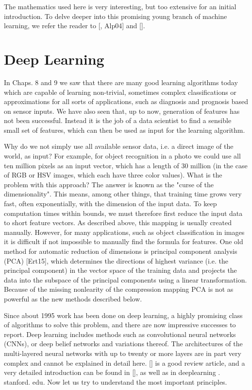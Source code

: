 \documentclass[10pt]{book}
\begin{document}
The mathematics used here is very interesting, but too extensive for an initial introduction. To delve deeper into this promising young branch of machine learning, we refer the reader to [\cite{scholkopf2002kernels}, Alp04] and [\cite{burges1998svm}].

\section{Deep Learning}
In Chaps. 8 and 9 we saw that there are many good learning algorithms today which are capable of learning non-trivial, sometimes complex classifications or approximations for all sorts of applications, such as diagnosis and prognosis based on sensor inputs. We have also seen that, up to now, generation of features has not been successful. Instead it is the job of a data scientist to find a sensible small set of features, which can then be used as input for the learning algorithm.

Why do we not simply use all available sensor data, i.e. a direct image of the world, as input? For example, for object recognition in a photo we could use all ten million pixels as an input vector, which has a length of 30 million (in the case of RGB or HSV images, which each have three color values). What is the problem with this approach? The answer is known as the "curse of the dimensionality". This means, among other things, that training time grows very fast, often exponentially, with the dimension of the input data. To keep computation times within bounds, we must therefore first reduce the input data to short feature vectors. As described above, this mapping is usually created manually. However, for many applications, such as object classification in images it is difficult if not impossible to manually find the formula for features. One old method for automatic reduction of dimensions is principal component analysis (PCA) [Ert15], which determines the directions of highest variance (i.e. the principal component) in the vector space of the training data and projects the data into the subspace of the principal components using a linear transformation. Because of the missing nonlearity of the compression mapping PCA is not as powerful as the new methods described below.

Since about 1995 work has been done on deep learning, a highly promising class of algorithms to solve this problem, and there are now impressive successes to report. Deep learning includes methods such as convolutional neural networks (CNNs), or deep belief networks and variations thereof. The architectures of the multi-layered neural networks with up to twenty or more layers are in part very complex and cannot be explained in detail here. [\cite{lecun2015deep}] is a good review article, and a very detailed introduction can be found in [\cite{goodfellow2016deeplearning}], as well as in deeplearning . stanford. edu. Now let us try to understand the most important principles.
\end{document}
